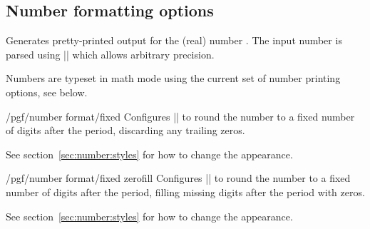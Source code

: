 \subsection{Number formatting options}
{
\begin{command}{}
Generates pretty-printed output for the (real) number . The input number  is parsed using |\pgfmathfloatparsenumber| which allows arbitrary precision.

Numbers are typeset in math mode using the current set of number printing options, see below.
\end{command}

\begin{key}{/pgf/number format/fixed}
Configures |\pgfmathprintnumber| to round the number to a fixed number of digits after the period, discarding any trailing zeros.

\begin{codeexample}[]
\hspace{1em}
\hspace{1em}
\hspace{1em}
\hspace{1em}
\end{codeexample}

See section~\ref{sec:number:styles} for how to change the appearance.
\end{key}

\begin{key}{/pgf/number format/fixed zerofill}
Configures |\pgfmathprintnumber| to round the number to a fixed number of digits after the period, filling missing digits after the period with zeros.

\begin{codeexample}[]
\hspace{1em}
\hspace{1em}
\hspace{1em}
\hspace{1em}
\end{codeexample}

See section~\ref{sec:number:styles} for how to change the appearance.
\end{key}

}
